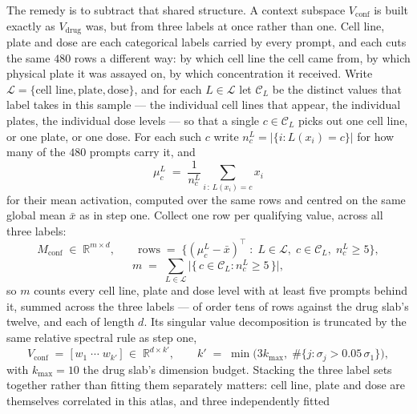 The remedy is to subtract that shared structure. A context subspace
$V_{\textrm{conf}}$ is built exactly as $V_{\textrm{drug}}$ was, but from three
labels at once rather than one. Cell line, plate and dose are each categorical
labels carried by every prompt, and each cuts the same $\num{480}$ rows a
different way: by which cell line the cell came from, by which physical plate
it was assayed on, by which concentration it received. Write
$\mathcal{L} = \{\textrm{cell line}, \textrm{plate}, \textrm{dose}\}$, and for
each $L \in \mathcal{L}$ let $\mathcal{C}_L$ be the distinct values that label
takes in this sample --- the individual cell lines that appear, the individual
plates, the individual dose levels --- so that a single $c \in \mathcal{C}_L$
picks out one cell line, or one plate, or one dose. For each such $c$ write
$n^{L}_{c} = |\{ i : L(x_i) = c \}|$ for how many of the $\num{480}$ prompts
carry it, and
\begin{equation}
  \mu^{L}_{c} \;=\; \frac{1}{n^{L}_{c}} \sum_{i \,:\, L(x_i) = c} x_i
\end{equation}
for their mean activation, computed over the same rows and centred on the same
global mean $\bar{x}$ as in step one. Collect one row per qualifying value,
across all three labels:
\begin{equation}
  M_{\textrm{conf}} \;\in\; \mathbb{R}^{m \times d},
  \qquad
  \textrm{rows} \;=\; \big\{ (\mu^{L}_{c} - \bar{x})^{\top} \;:\;
    L \in \mathcal{L},\; c \in \mathcal{C}_L,\; n^{L}_{c} \geq 5 \big\},
\end{equation}
\begin{equation}
  m \;=\; \sum_{L \in \mathcal{L}}
          \big| \{\, c \in \mathcal{C}_L : n^{L}_{c} \geq 5 \,\} \big| ,
\end{equation}
so $m$ counts every cell line, plate and dose level with at least five prompts
behind it, summed across the three labels --- of order tens of rows against the
drug slab's twelve, and each of length $d$. Its singular value decomposition is
truncated by the same relative spectral rule as step one,
\begin{equation}
  V_{\textrm{conf}} \;=\; \big[\, w_1 \;\cdots\; w_{k'} \,\big]
  \;\in\; \mathbb{R}^{d \times k'},
  \qquad
  k' \;=\; \min\!\big( 3k_{\max},\;
           \#\{ j : \sigma_j > 0.05\,\sigma_1 \} \big),
\end{equation}
with $k_{\max} = 10$ the drug slab's dimension budget. Stacking the three label
sets together rather than fitting them separately matters: cell line, plate and
dose are themselves correlated in this atlas, and three independently fitted
